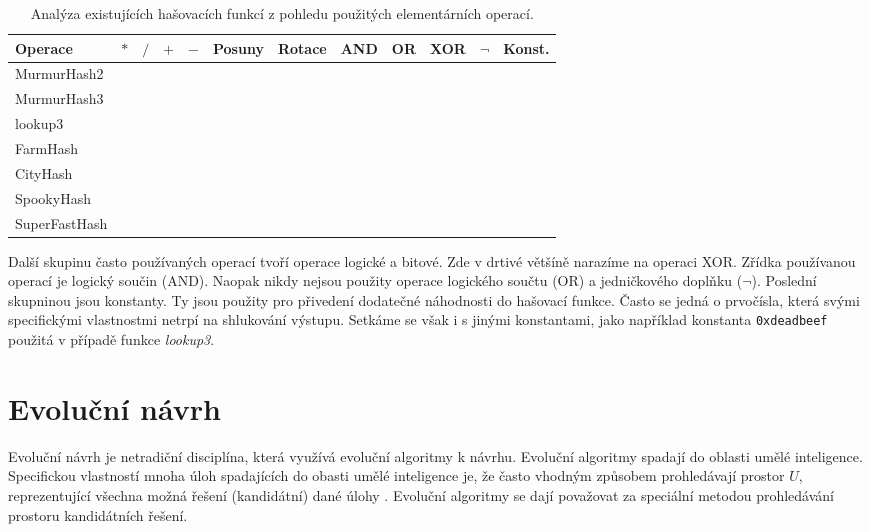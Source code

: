 \begin{table}[!ht]
	\centering
	\begin{tabular}{lccccccccccc}
		\hline
		Operace            & $*$ & $/$ & $+$ & $-$ & Posuny & Rotace & AND & OR & XOR & $\neg$ & Konst. \\
		\hline
		MurmurHash2   & \checkmark & & & & \checkmark & & & & \checkmark & & \checkmark \\
		MurmurHash3   & \checkmark & & \checkmark & &  & \checkmark & & & \checkmark & & \checkmark \\
		lookup3              & & & \checkmark & \checkmark & & \checkmark & & & \checkmark & & \checkmark \\
		FarmHash         & \checkmark & & \checkmark & & \checkmark & \checkmark & \checkmark & & \checkmark & & \checkmark  \\
		CityHash          & \checkmark & & \checkmark & & \checkmark & \checkmark & & & \checkmark & & \checkmark \\
		SpookyHash     & & & \checkmark & & & \checkmark & & & \checkmark & & \\
		SuperFastHash & & & \checkmark & & \checkmark & & & & \checkmark & & \\
		\hline		
	\end{tabular}
	\caption{Analýza existujících hašovacích funkcí z pohledu použitých elementárních operací.}
	\label{tab:generic_hashes_analysis}
\end{table}

Další skupinu často používaných operací tvoří operace logické a bitové. Zde v drtivé většíně narazíme na operaci XOR. Zřídka
používanou operací je logický součin (AND). Naopak nikdy nejsou použity operace logického součtu (OR) a jedničkového
doplňku ($\neg$). Poslední skupninou jsou konstanty. Ty jsou použity pro přivedení dodatečné náhodnosti do hašovací funkce.
Často se jedná o prvočísla, která svými specifickými vlastnostmi netrpí na shlukování výstupu. Setkáme se však i s jinými 
konstantami, jako například konstanta \texttt{0xdeadbeef} použitá v případě funkce \textit{lookup3}.

\chapter{Evoluční návrh}
\label{sec:evolution_design}

Evoluční návrh je netradiční disciplína, která využívá evoluční algoritmy
k návrhu. Evoluční algoritmy spadají do oblasti umělé 
inteligence. Specifickou vlastností mnoha úloh spadajících do obasti umělé 
inteligence je, že často vhodným způsobem prohledávají prostor $U$,
reprezentující všechna možná řešení (kandidátní) dané úlohy 
\cite{evolution_hardware}. Evoluční algoritmy se dají považovat za speciální metodou 
prohledávání prostoru kandidátních řešení.

